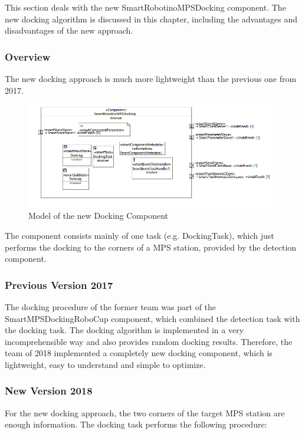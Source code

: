 This section deals with the new SmartRobotinoMPSDocking component. The new docking algorithm is discussed in this chapter, including the advantages and disadvantages of the new approach.

\subsubsection{Overview}

The new docking approach is much more lightweight than the previous one from 2017.

\begin{figure}[h]
\centering
\includegraphics[scale=0.65]{pic/dockingComponent.png}
\caption{Model of the new Docking Component }
\label{fig:i_overview}
\end{figure}

The component consists mainly of one task (e.g. DockingTask), which just performs the docking to the corners of a MPS station, provided by the detection component.

\subsubsection{Previous Version 2017}

The docking procedure of the former team was part of the SmartMPSDockingRoboCup component, which combined the detection task with the docking task.
The docking algorithm is implemented in a very incomprehensible way and also provides random docking results. Therefore, the team of 2018 implemented a completely new docking component, which is lightweight, easy to understand and simple to optimize.

\subsubsection{New Version 2018}

For the new docking approach, the two corners of the target MPS station are enough information. The docking task performs the following procedure:


